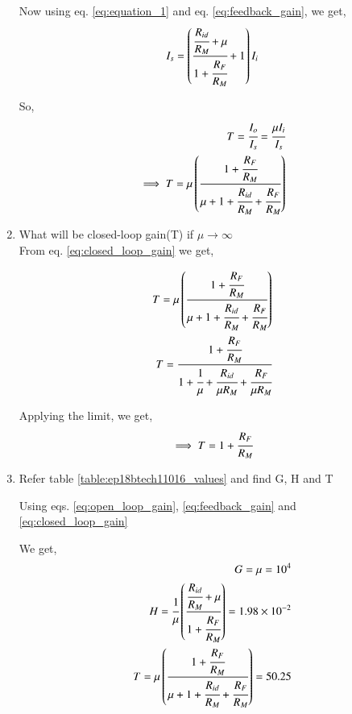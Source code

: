 \begin{enumerate}[label=\arabic*.,ref=\theenumi]
Now using eq. \ref{eq:equation_1} and eq. \ref{eq:feedback_gain}, we get,
\begin{align}
    I_s = \left(\cfrac{\cfrac{R_{id}}{R_M} + \mu}{1 + \cfrac{R_F}{R_M}} + 1\right) I_i
\end{align}

So,
\begin{align}
    T = \cfrac{I_o}{I_s} = \cfrac{\mu I_i}{I_s}\\
    \implies T = \mu \brak{ \cfrac{1 + \cfrac{R_F}{R_M}}{\mu + 1 + \cfrac{R_{id}}{R_M} + \cfrac{R_F}{R_M}} }
    \label{eq:closed_loop_gain}
\end{align}


\item What will be closed-loop gain(T) if $\mu \to \infty$
\\
\solution From eq. \ref{eq:closed_loop_gain} we get,

\begin{align}
    T = \mu \left( \cfrac{1 + \cfrac{R_F}{R_M}}{\mu + 1 + \cfrac{R_{id}}{R_M} + \cfrac{R_F}{R_M}} \right)
    \\
    T = \cfrac{1 + \cfrac{R_F}{R_M}}{1 + \cfrac{1}{\mu} + \cfrac{R_{id}}{\mu R_M} + \cfrac{R_F}{\mu R_M}}
\end{align}

Applying the limit, we get,
\begin{align}
    \implies T = 1 + \cfrac{R_F}{R_M}
\end{align}


\item Refer table \ref{table:ep18btech11016_values} and find G, H and T

\begin{table}[!ht]
    \centering
    
    \caption{}
    \label{table:ep18btech11016_values}
\end{table}

\solution Using eqs. \ref{eq:open_loop_gain}, \ref{eq:feedback_gain} and \ref{eq:closed_loop_gain}

We get,
\begin{align}
    G = \mu = 10^4\\
    H = \cfrac{1}{\mu}\left(\cfrac{\cfrac{R_{id}}{R_M} + \mu}{1 + \cfrac{R_F}{R_M}}\right) = 1.98 \times 10^{-2}\\
    T = \mu \left( \cfrac{1 + \cfrac{R_F}{R_M}}{\mu + 1 + \cfrac{R_{id}}{R_M} + \cfrac{R_F}{R_M}} \right) = 50.25
\end{align}


\end{enumerate}
